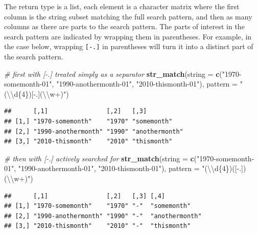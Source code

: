 \documentclass[]{book}
\newenvironment{Shaded}{}{}
\newcommand{\CharTok}[1]{\textcolor[rgb]{0.25,0.44,0.63}{#1}}
\newcommand{\CommentTok}[1]{\textcolor[rgb]{0.38,0.63,0.69}{\textit{#1}}}
\newcommand{\DataTypeTok}[1]{\textcolor[rgb]{0.56,0.13,0.00}{#1}}
\newcommand{\KeywordTok}[1]{\textcolor[rgb]{0.00,0.44,0.13}{\textbf{#1}}}
\newcommand{\NormalTok}[1]{#1}
\newcommand{\StringTok}[1]{\textcolor[rgb]{0.25,0.44,0.63}{#1}}
\begin{document}
The return type is a list, each element is a character matrix where the first column is the string subset matching the full search pattern, and then as many columns as there are parts to the search pattern. The parts of interest in the search pattern are indicated by wrapping them in parentheses. For example, in the case below, wrapping \texttt{{[}-.{]}} in parentheses will turn it into a distinct part of the search pattern.

\begin{Shaded}
\begin{Highlighting}[]
\CommentTok{# first with [-.] treated simply as a separator}
\KeywordTok{str_match}\NormalTok{(}\DataTypeTok{string =} \KeywordTok{c}\NormalTok{(}\StringTok{"1970-somemonth-01"}\NormalTok{,}
                     \StringTok{"1990-anothermonth-01"}\NormalTok{,}
                     \StringTok{"2010-thismonth-01"}\NormalTok{),}
          \DataTypeTok{pattern =} \StringTok{"(}\CharTok{\textbackslash{}\textbackslash{}}\StringTok{d\{4\})[-.](}\CharTok{\textbackslash{}\textbackslash{}}\StringTok{w+)"}\NormalTok{)}
\end{Highlighting}
\end{Shaded}

\begin{verbatim}
##      [,1]                [,2]   [,3]          
## [1,] "1970-somemonth"    "1970" "somemonth"   
## [2,] "1990-anothermonth" "1990" "anothermonth"
## [3,] "2010-thismonth"    "2010" "thismonth"
\end{verbatim}

\begin{Shaded}
\begin{Highlighting}[]
\CommentTok{# then with [-.] actively searched for}
\KeywordTok{str_match}\NormalTok{(}\DataTypeTok{string =} \KeywordTok{c}\NormalTok{(}\StringTok{"1970-somemonth-01"}\NormalTok{,}
                     \StringTok{"1990-anothermonth-01"}\NormalTok{,}
                     \StringTok{"2010-thismonth-01"}\NormalTok{),}
          \DataTypeTok{pattern =} \StringTok{"(}\CharTok{\textbackslash{}\textbackslash{}}\StringTok{d\{4\})([-.])(}\CharTok{\textbackslash{}\textbackslash{}}\StringTok{w+)"}\NormalTok{)}
\end{Highlighting}
\end{Shaded}

\begin{verbatim}
##      [,1]                [,2]   [,3] [,4]          
## [1,] "1970-somemonth"    "1970" "-"  "somemonth"   
## [2,] "1990-anothermonth" "1990" "-"  "anothermonth"
## [3,] "2010-thismonth"    "2010" "-"  "thismonth"
\end{verbatim}
\end{document}
